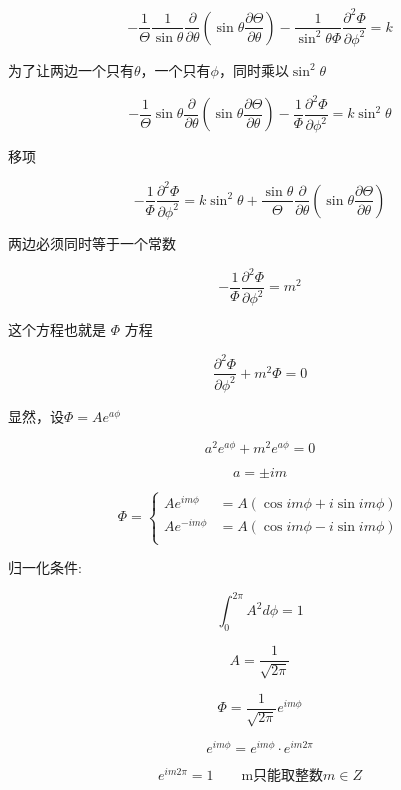 \[
    - \frac{1}{\Theta} \frac{1}{ \sin \theta} \frac{\partial}{\partial \theta} \left( \sin \theta \frac{\partial \Theta}{\partial \theta} \right) - \frac{1}{ \sin ^2 \theta \Phi} \frac{\partial ^2 \Phi}{\partial \phi ^2} = k
\]

为了让两边一个只有$\theta$，一个只有$\phi$，同时乘以$\sin ^2   \theta$

\[
    - \frac{1}{\Theta}  \sin \theta \frac{\partial}{\partial \theta} \left( \sin \theta \frac{\partial \Theta}{\partial \theta} \right) - \frac{1}{\Phi} \frac{\partial ^2 \Phi}{\partial \phi ^2} = k \sin ^2 \theta
\]

移项

\[
    -\frac{1}{\Phi} \frac{\partial ^2 \Phi}{\partial \phi ^2} = k \sin ^2 \theta  + \frac{\sin \theta}{\Theta}   \frac{\partial}{\partial \theta} \left( \sin \theta \frac{\partial \Theta}{\partial \theta} \right)
\]

两边必须同时等于一个常数 

\[
     - \frac{1}{\Phi} \frac{\partial ^2 \Phi}{\partial \phi ^2} = m^2
\]

这个方程也就是 $\Phi$ 方程

\[
    \frac{\partial ^2 \Phi}{\partial \phi ^2} + m^2 \Phi  = 0
\]

显然，设$\Phi = A e^{a \phi}$ 

\[
    a^2 e^{a \phi} + m^2 e^{a \phi} = 0
\]

\[
    a = \pm im  
\]

\[
    \Phi = \begin{cases}
        Ae^{im\phi} & = A( \cos im\phi + i \sin im \phi)  \\
        Ae^{-im\phi} & =  A( \cos im\phi - i \sin im \phi) \\
    \end{cases}  
\]

归一化条件:


\[
    \int_0^{2\pi} A^2 d\phi = 1 
\] 

\[
    A = \frac{1}{\sqrt{2\pi}}  
\]

\[
    \Phi = \frac{1}{\sqrt{2\pi}} e ^{im\phi}  
\]

\[
    e^{im\phi} = e^{im\phi} \cdot e^{im2\pi}  
\]

\[
    e^{im 2\pi} = 1  \qquad \mbox{m只能取整数} m \in Z
\]
